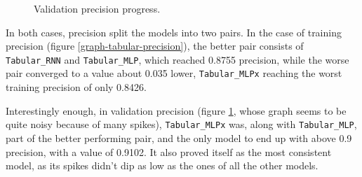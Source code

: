 \begin{figure}[!h]
\begin{minipage}{0.48\textwidth}
        \caption{Validation precision progress.}
        \label{graph-tabular-val_precision}
    \end{minipage}
\end{figure}
In both cases, precision split the models into two pairs. In the case of training precision (figure
\ref{graph-tabular-precision}), the better pair consists of \texttt{Tabular\_RNN} and \texttt{Tabular\_MLP},
which reached 0.8755 precision, while the worse pair converged to a value about 0.035 lower,
\texttt{Tabular\_MLPx} reaching the worst training precision of only 0.8426.

Interestingly enough, in validation precision (figure \ref{graph-tabular-val_precision}, whose graph seems to be quite noisy
because of many spikes),
\texttt{Tabular\_MLPx} was, along with \texttt{Tabular\_MLP}, part of the better performing pair,
and the only model to end up with above 0.9 precision, with a value of 0.9102.
It also proved itself as the most consistent model, as its spikes didn't dip as low as the ones of all the other models.
\pagebreak


